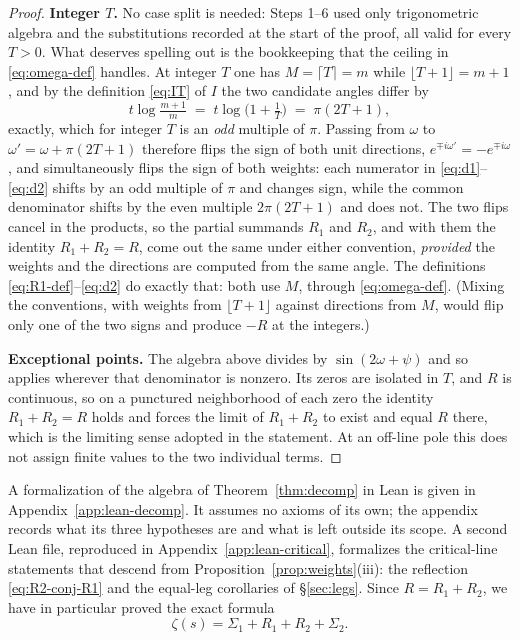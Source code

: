 \documentclass[11pt]{article}
\theoremstyle{definition}
\begin{document}
\begin{proof}
\smallskip
\noindent\textbf{Integer $T$.} No case split is needed: Steps 1--6 used
only trigonometric algebra and the substitutions recorded at the start of
the proof, all valid for every $T>0$. What deserves spelling out is the
bookkeeping that the ceiling in \eqref{eq:omega-def} handles. At integer
$T$ one has $M=\lceil T\rceil=m$ while $\lfloor T+1\rfloor=m+1$, and by the
definition \eqref{eq:IT} of $I$ the two candidate angles differ by
\[
t\log\tfrac{m+1}{m}
\;=\;
t\log\bigl(1+\tfrac1T\bigr)
\;=\;
\pi(2T+1),
\]
exactly, which for integer $T$ is an \emph{odd} multiple of $\pi$. Passing
from $\omega$ to $\omega'=\omega+\pi(2T+1)$ therefore flips the sign of
both unit directions, $e^{\mp i\omega'}=-e^{\mp i\omega}$, and
simultaneously flips the sign of both weights: each numerator in
\eqref{eq:d1}--\eqref{eq:d2} shifts by an odd multiple of $\pi$ and
changes sign, while the common denominator shifts by the even multiple
$2\pi(2T+1)$ and does not. The two flips cancel in the products, so the
partial summands $R_{1}$ and $R_{2}$, and with them the identity
$R_{1}+R_{2}=R$, come out the same under either convention,
\emph{provided} the weights and the directions are computed from the same
angle. The definitions \eqref{eq:R1-def}--\eqref{eq:d2} do exactly that:
both use $M$, through \eqref{eq:omega-def}. (Mixing the
conventions, with weights from $\lfloor T+1\rfloor$ against directions
from $M$, would flip only one of the two signs and produce
$-R$ at the integers.)

\smallskip
\noindent\textbf{Exceptional points.} The algebra above divides by
$\sin(2\omega+\psi)$ and so applies wherever that denominator is nonzero.
Its zeros are isolated in $T$, and $R$ is continuous, so on a punctured
neighborhood of each zero the identity $R_1+R_2=R$ holds and forces the
limit of $R_1+R_2$ to exist and equal $R$ there, which is the limiting
sense adopted in the statement. At an off-line pole this does not assign
finite values to the two individual terms.
\end{proof}

A formalization of the algebra of Theorem~\ref{thm:decomp} in Lean is given in
Appendix~\ref{app:lean-decomp}. It assumes no axioms of its own; the appendix
records what its three hypotheses are and what is left outside its scope.
A second Lean file, reproduced in Appendix~\ref{app:lean-critical}, formalizes
the critical-line statements that descend from
Proposition~\ref{prop:weights}(iii): the reflection \eqref{eq:R2-conj-R1} and
the equal-leg corollaries of \S\ref{sec:legs}.
Since $R=R_{1}+R_{2}$, we have in particular proved the exact formula
\begin{equation}\label{eq:zeta-ps}
\zeta(s)
=
\Sigma_{1} + R_{1} + R_{2} + \Sigma_{2}.
\end{equation}
\end{document}
